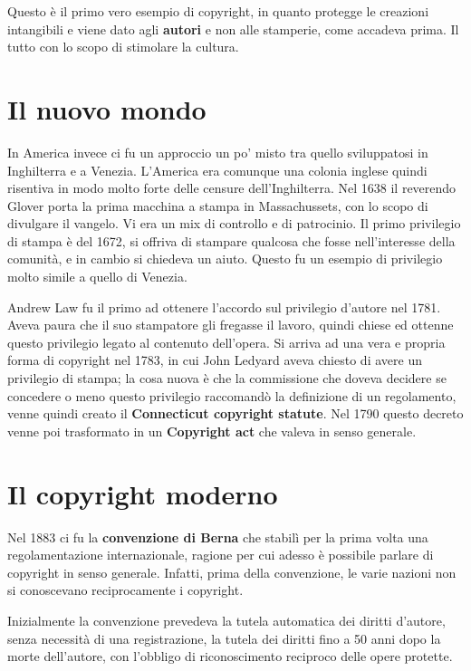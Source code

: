 Questo è il primo vero esempio di copyright, in quanto protegge le creazioni intangibili e viene dato agli \textbf{autori} e non alle stamperie, come accadeva prima. Il tutto con lo scopo di stimolare la cultura.

\section{Il nuovo mondo}

In America invece ci fu un approccio un po' misto tra quello sviluppatosi in Inghilterra e a Venezia. L'America era comunque una colonia inglese quindi risentiva in modo molto forte delle censure dell'Inghilterra. Nel 1638 il reverendo Glover porta la prima macchina a stampa in Massachussets, con lo scopo di divulgare il vangelo. Vi era un mix di controllo e di patrocinio.  Il primo privilegio di stampa è del 1672, si offriva di stampare qualcosa che fosse nell'interesse della comunità, e in cambio si chiedeva un aiuto. Questo fu un esempio di privilegio molto simile a quello di Venezia. 

Andrew Law fu il primo ad ottenere l'accordo sul privilegio d'autore nel 1781. Aveva paura che il suo stampatore gli fregasse il lavoro, quindi chiese ed ottenne questo privilegio legato al contenuto dell'opera. Si arriva ad una vera e propria forma di copyright nel 1783, in cui John Ledyard aveva chiesto di avere un privilegio di stampa; la cosa nuova è che la commissione che doveva decidere se concedere o meno questo privilegio raccomandò la definizione di un regolamento, venne quindi creato il \textbf{Connecticut copyright statute}. Nel 1790 questo decreto venne poi trasformato in un \textbf{Copyright act} che valeva in senso generale.

\section{Il copyright moderno}

Nel 1883 ci fu la \textbf{convenzione di Berna} che stabilì per la prima volta una regolamentazione internazionale, ragione per cui adesso è possibile parlare di copyright in senso generale. Infatti, prima della convenzione, le varie nazioni non si conoscevano reciprocamente i copyright. 

Inizialmente la convenzione prevedeva la tutela automatica dei diritti d'autore, senza necessità di una registrazione, la tutela dei diritti fino a 50 anni dopo la morte dell'autore, con l'obbligo di riconoscimento reciproco delle opere protette.

